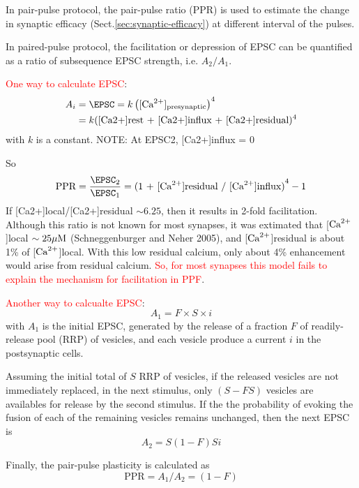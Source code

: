In pair-pulse protocol, the pair-pulse ratio (PPR) is used to estimate the
change in synaptic efficacy (Sect.\ref{sec:synaptic-efficacy}) at different
interval of the pulses.

In paired-pulse protocol, the facilitation or depression of
EPSC can be quantified as a ratio of subsequence EPSC strength, i.e. $A_2/A_1$.

\textcolor{red}{One way to calculate EPSC}:
\begin{equation}
\begin{split}
A_i &= \EPSC = k \left( [\Ca]_\text{presynaptic} \right)^4 \\ 
    &=  k(\text{[Ca2+]rest + [Ca2+]influx + [Ca2+]residual})^4
\end{split}
\end{equation}
with $k$ is a constant. NOTE: At EPSC2, [Ca2+]influx = 0

So
\begin{equation}
\text{PPR} = \frac{\EPSC_2}{\EPSC_1} = \text{(1 + [$\Ca$]residual /
[$\Ca$]influx)}^4 - 1
\end{equation}
If [Ca2+]local/[Ca2+]residual $\sim 6.25$, then it results in 2-fold
facilitation. Although this ratio is not known for most synapses, it was
extimated that [${\text{Ca}^{2+}}$]local $\sim 25 {\mu\text{M}}$ (Schneggenburger
and Neher 2005), and [${\text{Ca}^{2+}}$]residual is about 1\% of [${\text{Ca}^{2+}}$]local.
With this low residual calcium, only about 4\% enhancement would arise from
residual calcium. \textcolor{red}{So, for most synapses this model fails to
explain the mechanism for facilitation in PPF}.

\textcolor{red}{Another way to calcualte EPSC}:
\begin{equation}
A_1 = F \times S \times i
\end{equation}
with $A_1$ is the initial EPSC, generated by the release of a fraction $F$ of
readily-release pool (RRP) of vesicles, and each vesicle produce a current $i$
in the postsynaptic cells.

Assuming the initial total of $S$ RRP of vesicles, if the released vesicles are
not immediately replaced, in the next stimulus, only $(S-FS)$ vesicles are
availables for release by the second stimulus. If the  the probability of
evoking the fusion of each of the remaining vesicles remains unchanged, then the
next EPSC is
\begin{equation}
A_2 = S(1-F) Si
\end{equation}


Finally, the pair-pulse plasticity is calculated as
\begin{equation}
\label{eq:pair-pulse-plasticity}
\text{PPR} = A_1/A_2 = (1-F)
\end{equation}

